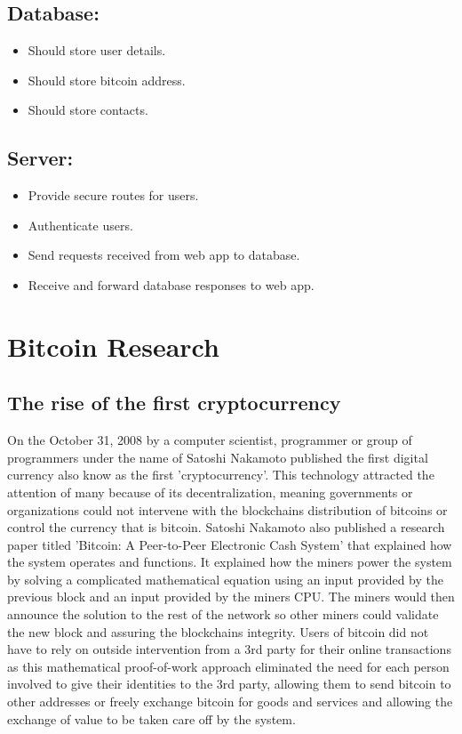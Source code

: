 \subsection{Database:}
\begin{itemize}
  \item Should store user details.
  \item Should store bitcoin address.
  \item Should store contacts.
\end{itemize}

\subsection{Server:}
\begin{itemize}
  \item Provide secure routes for users.
  \item Authenticate users.
  \item Send requests received from web app to database.
  \item Receive and forward database responses to web app.
\end{itemize}

\section{Bitcoin Research}
\subsection{The rise of the first cryptocurrency}
On the October 31, 2008 by a computer scientist, programmer or group of programmers under the name of Satoshi Nakamoto published the first digital currency also know as the first 'cryptocurrency'. This technology attracted the attention of many because of its decentralization, meaning governments or organizations could not intervene with the blockchains distribution of bitcoins or control the currency that is bitcoin. Satoshi Nakamoto also published a research paper titled \cite{Satoshi}'Bitcoin: A Peer-to-Peer Electronic Cash System' that explained how the system operates and functions. It explained how the miners power the system by solving a complicated mathematical equation using an input provided by the previous block and an input provided by the miners CPU. The miners would then announce the solution to the rest of the network so other miners could validate the new block and assuring the blockchains integrity. Users of bitcoin did not have to rely on outside intervention from a 3rd party for their online transactions as this mathematical proof-of-work approach eliminated the need for each person involved to give their identities to the 3rd party, allowing them to send bitcoin to other addresses or freely exchange bitcoin for goods and services and allowing the exchange of value to be taken care off by the system.

